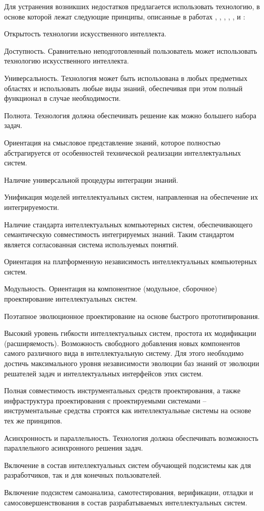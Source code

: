 \begin{partbacktext}
Для устранения возникших недостатков предлагается использовать технологию, в основе которой лежат следующие принципы, описанные в работах , , , , ,  и :
\begin{textitemize}
	\item Открытость технологии искусственного интеллекта.
	\item Доступность. Сравнительно неподготовленный пользователь может использовать технологию искусственного интеллекта.
	\item Универсальность. Технология может быть использована в любых предметных областях и использовать любые виды знаний, обеспечивая при этом полный функционал в случае необходимости.
	\item Полнота. Технология должна обеспечивать решение как можно большего набора задач.
	\item Ориентация на смысловое представление знаний, которое полностью абстрагируется от	особенностей технической реализации интеллектуальных систем.
	\item Наличие универсальной процедуры интеграции знаний.
	\item Унификация моделей интеллектуальных систем, направленная на обеспечение их интегрируемости.
	\item Наличие стандарта интеллектуальных компьютерных систем, обеспечивающего семантическую совместимость интегрируемых знаний. Таким стандартом является согласованная система используемых понятий.
	\item Ориентация на платформенную независимость интеллектуальных компьютерных систем.
	\item Модульность. Ориентация на компонентное (модульное, сборочное) проектирование интеллектуальных систем.
	\item Поэтапное эволюционное проектирование на основе быстрого прототипирования.
	\item Высокий уровень гибкости интеллектуальных систем, простота их модификации (расширяемость). Возможность свободного добавления новых компонентов самого различного вида в интеллектуальную систему. Для этого необходимо достичь максимального уровня независимости эволюции баз знаний от эволюции решателей задач и интеллектуальных интерфейсов этих систем.
	\item Полная совместимость инструментальных средств проектирования, а также инфраструктура проектирования с проектируемыми системами -- инструментальные средства строятся как интеллектуальные системы на основе тех же принципов.
	\item Асинхронность и параллельность. Технология должна обеспечивать возможность параллельного асинхронного решения задач.
	\item Включение в состав интеллектуальных систем обучающей подсистемы как для разработчиков, так и для конечных пользователей.
	\item Включение подсистем самоанализа, самотестирования, верификации, отладки и самосовершенствования в состав разрабатываемых интеллектуальных систем.
\end{textitemize}


\end{partbacktext}
